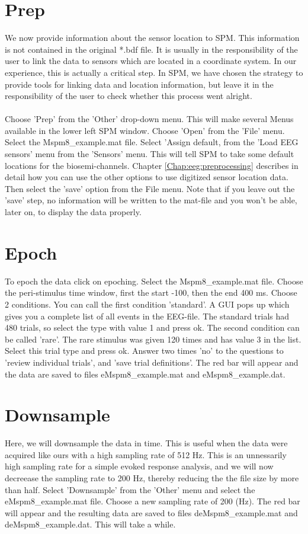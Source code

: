 \section{Prep}
We now provide information about the sensor location to SPM. This information is not contained in the original *.bdf file. It is usually in the responsibility of the user to link the data to sensors which are located in a coordinate system. In our experience, this is actually a critical step. In SPM, we have chosen the strategy to provide tools for linking data and location information, but leave it in the responsibility of the user to check whether this process went alright. 
\\
\\
Choose 'Prep' from the 'Other' drop-down menu. This will make several Menus available in the lower left SPM window. Choose 'Open' from the 'File' menu. Select the Mspm8\_example.mat file. Select 'Assign default, from the 'Load EEG sensors' menu from the 'Sensors' menu. This will tell SPM to take some default locations for the biosemi-channels. Chapter \ref{Chap:eeg:preprocessing} describes in detail how you can use the other options to use digitized sensor location data. Then select the 'save' option from the File menu. Note that if you leave out the 'save' step, no information will be written to the mat-file and you won't be able, later on, to display the data properly.


\section{Epoch}
To epoch the data click on epoching. Select the Mspm8\_example.mat file. Choose the peri-stimulus time window, first the start -100, then the end 400 ms. Choose 2 conditions. You can call the first condition 'standard'. A GUI pops up which gives you a complete list of all events in the EEG-file. The standard trials had 480 trials, so select the type with value 1 and press ok. The second condition can be called 'rare'. The rare stimulus was given 120 times and has value 3 in the list. Select this trial type and press ok. Answer two times 'no' to the questions to 'review individual trials', and 'save trial definitions'. The red bar will appear and the data are saved to files eMspm8\_example.mat and eMspm8\_example.dat.

\section{Downsample}
Here, we will downsample the data in time. This is useful when the data were acquired like ours with a high sampling rate of 512 Hz. This is an unnessarily high sampling rate for a simple evoked response analysis, and we will now decreease the sampling rate to 200 Hz, thereby reducing the the file size by more than half. Select 'Downsample' from the 'Other' menu and select the eMspm8\_example.mat file. Choose a new sampling rate of 200 (Hz). The red bar will appear and the resulting data are saved to files deMspm8\_example.mat and deMspm8\_example.dat. This will take a while.


